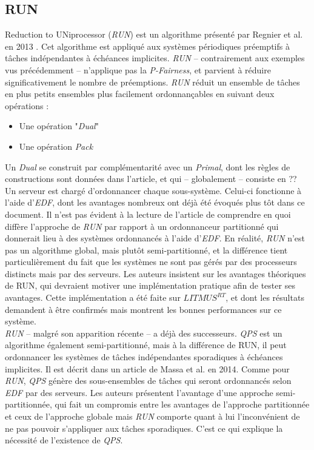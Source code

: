 \documentclass[11pt,a4paper,oneside]{report}
\begin{document}
\subsection{RUN}
Reduction to UNiprocessor (\textit{RUN}) est un algorithme présenté par Regnier et al. en 2013 \cite{regnier_multiprocessor_2013}. 
Cet algorithme est appliqué aux systèmes périodiques préemptifs à tâches indépendantes à 
échéances implicites. \textit{RUN} -- contrairement aux exemples vus précédemment -- n'applique pas 
la \textit{P-Fairness}, et parvient à réduire significativement le nombre de préemptions. 
\textit{RUN} réduit un ensemble de tâches en plus petits ensembles plus facilement ordonnançables 
en suivant deux opérations :\\
\begin{itemize}
    \item Une opération "\textit{Dual}"
    \item Une opération \textit{Pack}
\end{itemize}
Un \textit{Dual} se construit par complémentarité avec un \textit{Primal}, dont les règles de constructions sont 
données dans l'article, et qui -- globalement -- consiste en ?? %
Un serveur est chargé d'ordonnancer chaque sous-système. Celui-ci fonctionne à l'aide 
d'\textit{EDF}, dont les avantages nombreux ont déjà été évoqués plus tôt dans ce document. 
Il n'est pas évident à la lecture de l'article de comprendre en quoi 
diffère l'approche de \textit{RUN} par rapport à un ordonnanceur 
partitionné qui donnerait lieu à des systèmes ordonnancés à l'aide d'\textit{EDF}. 
En réalité, \textit{RUN} n'est pas un algorithme global, mais plutôt 
semi-partitionné, et la différence tient particulièrement du fait que les systèmes ne sont pas 
gérés par des processeurs distincts mais par des serveurs.  
Les auteurs insistent sur les avantages théoriques de RUN, qui devraient motiver une implémentation 
pratique afin de tester ses avantages. Cette implémentation a été faite 
\cite{compagnin_putting_2014} sur $LITMUS^{RT}$, et dont les résultats demandent à 
être confirmés mais montrent les bonnes performances sur ce système.\\

\textit{RUN} -- malgré son apparition récente -- a déjà des successeurs. \textit{QPS} est un algorithme 
également semi-partitionné, mais à la différence de RUN, il peut ordonnancer les systèmes 
de tâches indépendantes sporadiques à échéances implicites. 
Il est décrit dans un article de Massa et al. \cite{massa_outstanding_2014} en 2014. 
Comme pour \textit{RUN}, \textit{QPS} génère des sous-ensembles de tâches qui seront ordonnancés 
selon \textit{EDF} par des serveurs. Les auteurs présentent l'avantage d'une approche semi-partitionnée, 
qui fait un compromis entre les avantages de l'approche partitionnée et ceux de l'approche globale 
mais \textit{RUN} comporte quant à lui l'inconvénient de ne pas pouvoir s'appliquer aux tâches sporadiques. C'est ce qui explique la nécessité de l'existence de \textit{QPS}.
\end{document}

